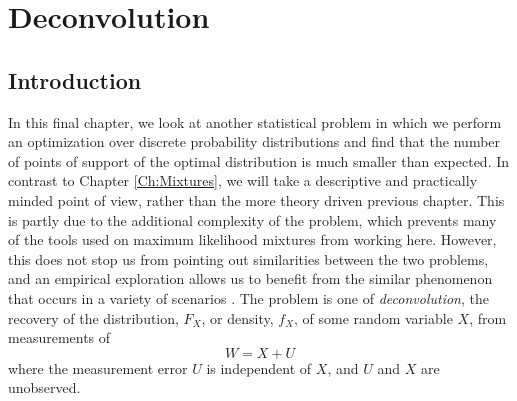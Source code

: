\chapter{Deconvolution}
\label{Ch:Deconvolution}




\section{Introduction}
	In this final chapter, we look at another statistical problem in which we perform an optimization over discrete probability distributions and find that the number of points of support of the optimal distribution is much smaller than expected. In contrast to Chapter \ref{Ch:Mixtures}, we will take a descriptive and practically minded point of view, rather than the more theory driven previous chapter. This is partly due to the additional complexity of the problem, which prevents many of the tools used on maximum likelihood mixtures from working here. However, this does not stop us from pointing out similarities between the two problems, and an empirical exploration allows us to benefit from the similar phenomenon that occurs in a variety of scenarios
.
	The problem is one of \emph{deconvolution}, the recovery of the distribution, $F_X$, or density, $f_X$, of some random variable $X$, from measurements of
	\begin{equation}
		W = X + U
		\label{eq:W=X+U}
	\end{equation}
	where the measurement error $U$ is independent of $X$, and $U$ and $X$ are unobserved. %

